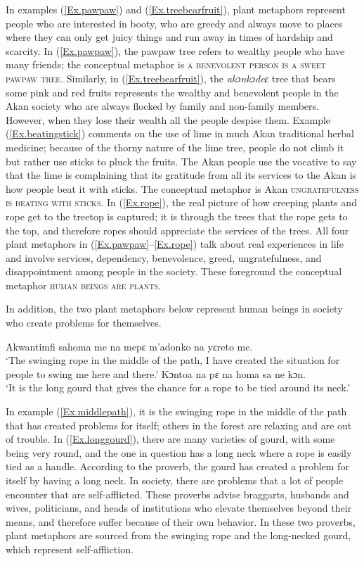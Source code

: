 \documentclass[output=paper,colorlinks,citecolor=brown]{langscibook}
\begin{document}
In examples (\ref{Ex.pawpaw}) and (\ref{Ex.treebearfruit}), plant metaphors represent people who are interested in booty, who are greedy and always move to places where they can only get juicy things and run away in times of hardship and scarcity. In (\ref{Ex.pawpaw}), the pawpaw tree refers to wealthy people who have many friends; the conceptual metaphor is \textsc{a benevolent person is a sweet pawpaw tree}. Similarly, in (\ref{Ex.treebearfruit}), the \textit{akɔnkɔdeɛ} tree that bears some pink and red fruits represents the wealthy and benevolent people in the Akan society who are always flocked by family and non-family members. However, when they lose their wealth all the people despise them. Example (\ref{Ex.beatingstick}) comments on the use of lime in much Akan traditional herbal medicine; because of the thorny nature of the lime tree, people do not climb it but rather use sticks to pluck the fruits. The Akan people use the vocative to say that the lime is complaining that its gratitude from all its services to the Akan is how people beat it with sticks. The conceptual metaphor is Akan \textsc{ungratefulness is beating with sticks}. In (\ref{Ex.rope}), the real picture of how creeping plants and rope get to the treetop is captured; it is through the trees that the rope gets to the top, and therefore ropes should appreciate the services of the trees. All four plant metaphors in (\ref{Ex.pawpaw}--\ref{Ex.rope}) talk about real experiences in life and involve services, dependency, benevolence, greed, ungratefulness, and disappointment among people in the society. These foreground the conceptual metaphor \textsc{human beings are plants}.

In addition, the two plant metaphors below represent human beings in society who create problems for themselves.

\ea \label{Ex.middlepath}
\gl Akwantimfi sahoma me na mepɛ m’adonko na yɛreto me.\\
\glt  ‘The swinging rope in the middle of the path, I have created the situation for people to swing me here and there.' 
\ex \label{Ex.longgourd}
\gl Kɔntoa na pɛ na homa sa ne kɔn.\\
\glt  ‘It is the long gourd that gives the chance for a rope to be tied around its neck.'
\z

In example (\ref{Ex.middlepath}), it is the swinging rope in the middle of the path that has created problems for itself; others in the forest are relaxing and are out of trouble. In (\ref{Ex.longgourd}), there are many varieties of gourd, with some being very round, and the one in question has a long neck where a rope is easily tied as a handle. According to the  proverb, the gourd has created a problem for itself by having a long neck. In society, there are problems that a lot of people encounter that are self-afflicted. These proverbs advise braggarts, husbands and wives, politicians, and heads of institutions who elevate themselves beyond their means, and therefore suffer because of their own behavior. In these two proverbs, plant metaphors are sourced from the swinging rope and the long-necked gourd, which represent self-affliction. 
\end{document}
